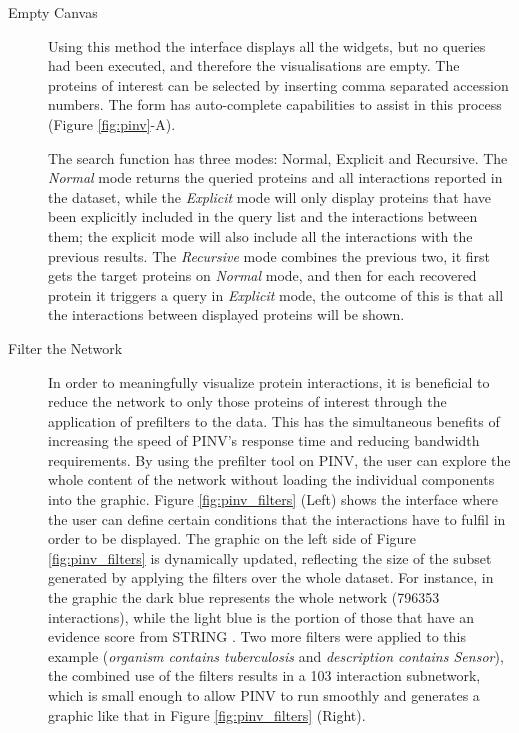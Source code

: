 \begin{description}
\item[Empty Canvas] 
Using this method the interface displays all the widgets, but no queries had been executed, and therefore the visualisations are empty. The proteins of interest can be selected by inserting comma separated accession numbers. The form has auto-complete capabilities to assist in this process (Figure \ref{fig:pinv}-A). 

The search function has three modes: Normal, Explicit and Recursive. The \emph{Normal} mode returns the queried proteins and all interactions reported in the dataset, while the \emph{Explicit} mode will only display proteins that have been explicitly included in the query list and the interactions between them; the explicit mode will also include all the interactions with the previous results.
The \emph{Recursive} mode combines the previous two, it first gets the target proteins on \emph{Normal} mode, and then for each recovered protein it triggers a query in \emph{Explicit} mode, the outcome of this is that all the interactions between displayed proteins will be shown.

\item[Filter the Network] 
In order to meaningfully visualize protein interactions, it is beneficial to reduce the network to only those proteins of interest through the application of prefilters to the data. This has the simultaneous benefits of increasing the speed of PINV's response time and reducing bandwidth requirements. By using the prefilter tool on PINV, the user can explore the whole content of the network without loading the individual components into the graphic. Figure \ref{fig:pinv_filters} (Left) shows the interface where the user can define certain conditions that the interactions have to fulfil in order to be displayed. The graphic on the left side of Figure \ref{fig:pinv_filters} is dynamically updated, reflecting the size of the subset generated by applying the filters over the whole dataset. For instance, in the graphic the dark blue represents the whole network (796353 interactions), while the light blue is the portion of those that have an evidence score from STRING \cite{FRA2013}. Two more filters were applied to this example (\emph{organism contains tuberculosis} and \emph{description contains Sensor}), the combined use of the filters results in a 103 interaction subnetwork, which is small enough to allow PINV to run smoothly and generates a graphic like that in Figure \ref{fig:pinv_filters} (Right).


\end{description}
